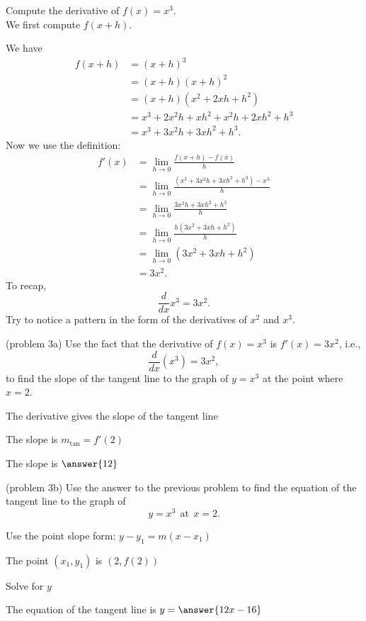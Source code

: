 \documentclass{ximera}
\begin{document}
\begin{example}[example 3]
Compute the derivative of  $f(x) = x^3$.\\
We first compute $f(x+h)$.

We have
\begin{align*}
f(x+h) &= (x+h)^3  \\
       &= (x+h)(x+h)^2 \\
			&= (x+h)(x^2 + 2xh + h^2)\\
			&= x^3 + 2x^2h + xh^2 + x^2h + 2xh^2 + h^3\\
			&= x^3 + 3x^2h + 3xh^2 + h^3.
\end{align*}
Now we use the definition:
\begin{align*}
f'(x) &= \lim_{h \to 0} \frac{f(x+h)-f(x)}{h}\\[5pt]
&= \lim_{h \to 0} \frac{(x^3 + 3x^2h + 3xh^2 + h^3)- x^3}{h}\\[5pt]
&= \lim_{h \to 0} \frac{3x^2h + 3xh^2 + h^3}{h}\\[5pt]
&= \lim_{h \to 0} \frac{h(3x^2 + 3xh + h^2)}{h}\\[5pt]
&= \lim_{h \to 0} (3x^2 + 3xh + h^2) \\
&= 3x^2.
\end{align*}
To recap, 
\[
\frac{d}{dx}x^3 = 3x^2.
\]
Try to notice a pattern in the form of the derivatives of $x^2$ and $x^3$.

\end{example}




\begin{problem}(problem 3a)
Use the fact that the derivative of $f(x) = x^3$ is $f'(x) = 3x^2$,
i.e., 
\[
\frac{d}{dx}\left( x^3 \right) = 3x^2,
\]
to find the slope of the tangent line to the graph of 
$y = x^3$ at the point where $x = 2$.\\
\begin{hint}
The derivative gives the slope of the tangent line
\end{hint}
\begin{hint}
The slope is $m_{\text{tan}} = f'(2)$
\end{hint}
The slope is $\answer{12}$
\end{problem}




\begin{problem}(problem 3b)
Use the answer to the previous problem to find the equation of the tangent line to the graph of 
\[
y = x^3 \ \ \text{at} \ \ x=2.
\]
\begin{hint}
Use the point slope form: $y-y_1 = m(x-x_1)$
\end{hint}
\begin{hint}
The point $(x_1,y_1)$ is $(2, f(2))$
\end{hint}
\begin{hint}
Solve for $y$
\end{hint}
The equation of the tangent line is \; $y = \answer{12x-16}$
\end{problem}
\end{document}

